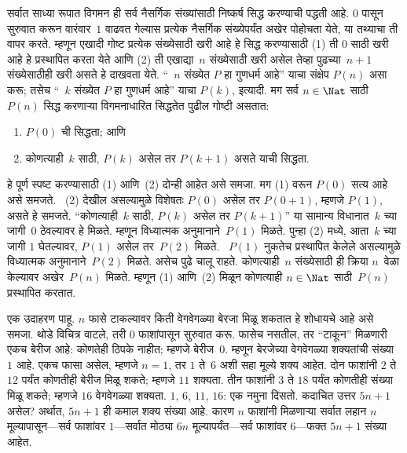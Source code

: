 \documentclass[../../../include/open-logic-section]{subfiles}
\begin{document}


सर्वात साध्या रूपात विगमन ही सर्व नैसर्गिक संख्यांसाठी निष्कर्ष सिद्ध करण्याची पद्धती आहे. $0$ पासून सुरुवात करून वारंवार~$1$ वाढवत गेल्यास प्रत्येक नैसर्गिक संख्येपर्यंत अखेर पोहोचता येते, या तथ्याचा ती वापर करते. म्हणून एखादी गोष्ट प्रत्येक संख्येसाठी खरी आहे हे सिद्ध करण्यासाठी (1) ती $0$ साठी खरी आहे हे प्रस्थापित करता येते आणि (2) ती एखाद्या~$n$ संख्येसाठी खरी असेल तेव्हा पुढच्या~$n+1$ संख्येसाठीही खरी असते हे दाखवता येते. “~$n$ संख्येत $P$ हा गुणधर्म आहे” याचा संक्षेप $P(n)$ असा करू; तसेच “~$k$ संख्येत $P$ हा गुणधर्म आहे” याचा $P(k)$, इत्यादी. मग सर्व $n \in \Nat$ साठी $P(n)$ सिद्ध करणाऱ्या विगमनाधारित सिद्धतेत पुढील गोष्टी असतात:
\begin{enumerate}
\item $P(0)$ ची सिद्धता; आणि
\item कोणत्याही~$k$ साठी, $P(k)$ असेल तर $P(k+1)$ असते याची सिद्धता.
\end{enumerate}
हे पूर्ण स्पष्ट करण्यासाठी (1) आणि~(2) दोन्ही आहेत असे समजा. मग (1) वरून $P(0)$ सत्य आहे असे समजते. ~(2) देखील असल्यामुळे विशेषतः $P(0)$ असेल तर $P(0+1)$, म्हणजे $P(1)$, असते हे समजते. “कोणत्याही~$k$ साठी, $P(k)$ असेल तर $P(k+1)$” या सामान्य विधानात~$k$ च्या जागी~$0$ ठेवल्यावर हे मिळते. म्हणून विध्यात्मक अनुमानाने~$P(1)$ मिळते. पुन्हा (2) मध्ये, आता~$k$ च्या जागी $1$ घेतल्यावर, $P(1)$ असेल तर~$P(2)$ मिळते. ~$P(1)$ नुकतेच प्रस्थापित केलेले असल्यामुळे विध्यात्मक अनुमानाने~$P(2)$ मिळते. असेच पुढे चालू राहते. कोणत्याही~$n$ संख्येसाठी ही क्रिया $n$~वेळा केल्यावर अखेर~$P(n)$ मिळते. म्हणून (1) आणि~(2) मिळून कोणत्याही $n \in \Nat$ साठी~$P(n)$ प्रस्थापित करतात.

एक उदाहरण पाहू. $n$ फासे टाकल्यावर किती वेगवेगळ्या बेरजा मिळू शकतात हे शोधायचे आहे असे समजा. थोडे विचित्र वाटले, तरी $0$ फाशांपासून सुरुवात करू. फासेच नसतील, तर “टाकून” मिळणारी एकच बेरीज आहे: कोणतेही ठिपके नाहीत; म्हणजे बेरीज~$0$. म्हणून बेरजेच्या वेगवेगळ्या शक्यतांची संख्या~$1$ आहे. एकच फासा असेल, म्हणजे $n=1$, तर $1$ ते~$6$ अशी सहा मूल्ये शक्य आहेत. दोन फाशांनी $2$ ते $12$ पर्यंत कोणतीही बेरीज मिळू शकते; म्हणजे $11$ शक्यता. तीन फाशांनी $3$ ते $18$ पर्यंत कोणतीही संख्या मिळू शकते; म्हणजे $16$ वेगवेगळ्या शक्यता. $1$, $6$, $11$, $16$: एक नमुना दिसतो. कदाचित उत्तर $5n+1$ असेल? अर्थात, $5n+1$ ही कमाल शक्य संख्या आहे. कारण $n$ फाशांनी मिळणाऱ्या सर्वात लहान $n$ मूल्यापासून---सर्व फाशांवर $1$---सर्वात मोठ्या $6n$ मूल्यापर्यंत---सर्व फाशांवर $6$---फक्त $5n+1$ संख्या आहेत.
\end{document}
